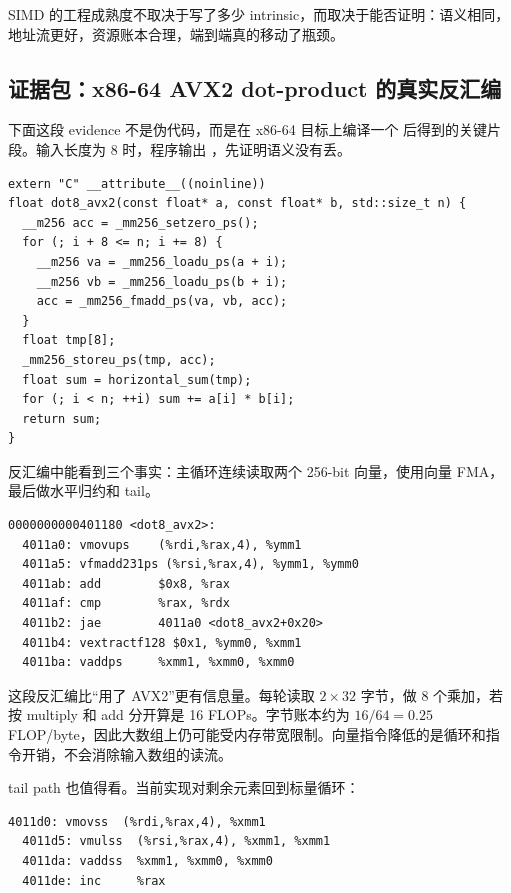 SIMD 的工程成熟度不取决于写了多少 intrinsic，而取决于能否证明：语义相同，地址流更好，资源账本合理，端到端真的移动了瓶颈。

\subsection{证据包：x86-64 AVX2 dot-product 的真实反汇编}

下面这段 evidence 不是伪代码，而是在 x86-64 目标上编译一个  后得到的关键片段。输入长度为 8 时，程序输出 ，先证明语义没有丢。

\begin{lstlisting}[numbers=none,caption={AVX2 dot-product 的源码轮廓}]
extern "C" __attribute__((noinline))
float dot8_avx2(const float* a, const float* b, std::size_t n) {
  __m256 acc = _mm256_setzero_ps();
  for (; i + 8 <= n; i += 8) {
    __m256 va = _mm256_loadu_ps(a + i);
    __m256 vb = _mm256_loadu_ps(b + i);
    acc = _mm256_fmadd_ps(va, vb, acc);
  }
  float tmp[8];
  _mm256_storeu_ps(tmp, acc);
  float sum = horizontal_sum(tmp);
  for (; i < n; ++i) sum += a[i] * b[i];
  return sum;
}
\end{lstlisting}

反汇编中能看到三个事实：主循环连续读取两个 256-bit 向量，使用向量 FMA，最后做水平归约和 tail。

\begin{lstlisting}[numbers=none,caption={objdump 关键片段}]
0000000000401180 <dot8_avx2>:
  4011a0: vmovups    (%rdi,%rax,4), %ymm1
  4011a5: vfmadd231ps (%rsi,%rax,4), %ymm1, %ymm0
  4011ab: add        $0x8, %rax
  4011af: cmp        %rax, %rdx
  4011b2: jae        4011a0 <dot8_avx2+0x20>
  4011b4: vextractf128 $0x1, %ymm0, %xmm1
  4011ba: vaddps     %xmm1, %xmm0, %xmm0
\end{lstlisting}

这段反汇编比“用了 AVX2”更有信息量。每轮读取 \(2 \times 32\) 字节，做 8 个乘加，若按 multiply 和 add 分开算是 16 FLOPs。字节账本约为 \(16/64=0.25\) FLOP/byte，因此大数组上仍可能受内存带宽限制。向量指令降低的是循环和指令开销，不会消除输入数组的读流。

tail path 也值得看。当前实现对剩余元素回到标量循环：

\begin{lstlisting}[numbers=none,caption={tail path 证据片段}]
  4011d0: vmovss  (%rdi,%rax,4), %xmm1
  4011d5: vmulss  (%rsi,%rax,4), %xmm1, %xmm1
  4011da: vaddss  %xmm1, %xmm0, %xmm0
  4011de: inc     %rax
\end{lstlisting}

